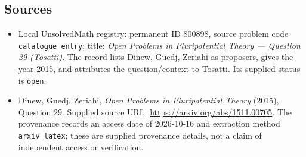 \documentclass[11pt]{article}
\begin{document}
\subsection{Sources}
\begin{itemize}
\item Local UnsolvedMath registry: permanent ID \(800898\), source problem code \texttt{catalogue entry}; title: \emph{Open Problems in Pluripotential Theory --- Question 29 (Tosatti)}. The record lists Dinew, Guedj, Zeriahi as proposers, gives the year 2015, and attributes the question/context to Tosatti. Its supplied status is \texttt{open}.
\item Dinew, Guedj, Zeriahi, \emph{Open Problems in Pluripotential Theory} (2015), Question 29. Supplied source URL: \url{https://arxiv.org/abs/1511.00705}. The provenance records an access date of 2026-10-16 and extraction method \texttt{arxiv\_latex}; these are supplied provenance details, not a claim of independent access or verification.
\end{itemize}
\end{document}
